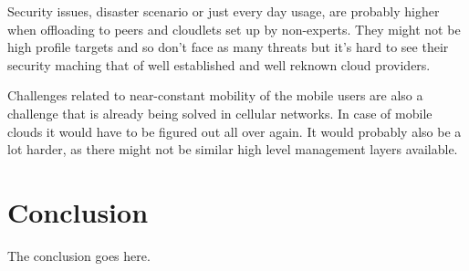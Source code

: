 \documentclass[conference]{IEEEtran}
\begin{document}
\par
Security issues, disaster scenario or just every day usage, are probably higher when offloading to peers and cloudlets set up by non-experts. They might not be high profile targets and so don't face as many threats but it's hard to see their security maching that of well established and well reknown cloud providers.
\par
Challenges related to near-constant mobility of the mobile users are also a challenge that is already being solved in cellular networks. In case of mobile clouds it would have to be figured out all over again. It would probably also be a lot harder, as there might not be similar high level management layers available.

\section{Conclusion}
The conclusion goes here.
\end{document}
